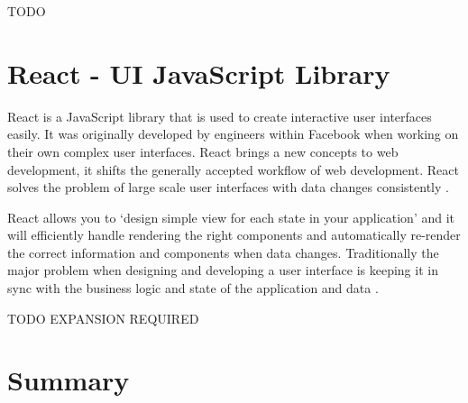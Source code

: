 TODO

\section{React - UI JavaScript Library}

React is a JavaScript library that is used to create interactive user interfaces easily. It was originally developed by engineers within Facebook when working on their own complex user interfaces. React brings a new concepts to web development, it shifts the generally accepted workflow of web development. React solves the problem of large scale user interfaces with data changes consistently \cite{reactintro2015}.

React allows you to `design simple view for each state in your application' and it will efficiently handle rendering the right components and automatically re-render the correct information and components when data changes\cite{react}. Traditionally the major problem when designing and developing a user interface is keeping it in sync with the business logic and state of the application and data \cite{staff2016react}.

TODO EXPANSION REQUIRED

\section{Summary}
